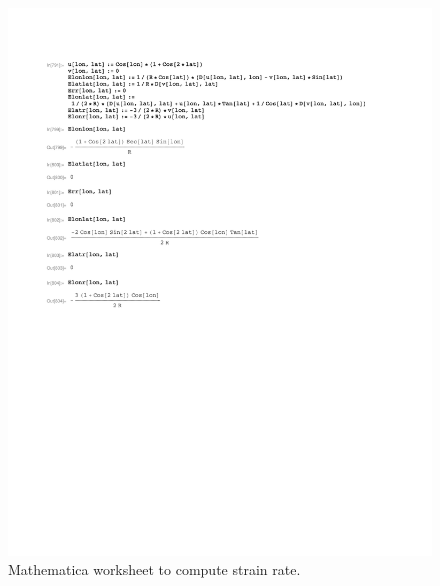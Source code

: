 \documentclass[11pt]{report}
\begin{document}
\begin{figure}[htbp]
 \center
 \includegraphics[scale=0.8, trim = 0 4in 0 0, clip]{f/130520_u_coscos.pdf}
 \caption{Mathematica worksheet to compute strain rate.}
 \label{fig:mathematica1}
\end{figure}
\end{document}
